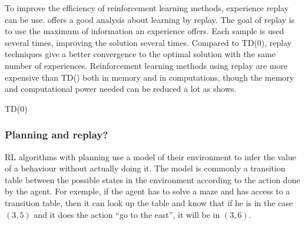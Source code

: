 \documentclass[]{article}
\begin{document}
To improve the efficiency of reinforcement learning methods, experience replay can be use. \textcite{vanseijen_deeper_2015} offers a good analysis about learning by replay. The goal of replay is to use the maximum of information an experience offers. Each sample is used several times, improving the solution several times. Compared to TD(0), replay techniques give a better convergence to the optimal solution with the same number of experiences. Reinforcement learning methods using replay are more expensive than TD(\textlambda) both in memory and in computations, though the memory and computational power needed can be reduced a lot as \textcite{vanseijen_deeper_2015} shows.

\begin{algorithm}[H]
  \DontPrintSemicolon
  \SetAlgoNoLine
  \caption{TD(0)}

\end{algorithm}

\subsubsection{Planning and replay?}
\label{subs:Planning and replay}

RL algorithms with planning use a model of their environment to infer the value  of a behaviour without actually doing it. The model is commonly a transition table between the possible states in the environment according to the action done by the agent. For exemple, if the agent has to solve a maze and has access to a transition table, then it can look up the table and know that if he is in the case \((3, 5)\) and it does the action ``go to the east'', it will be in \((3, 6)\).
\end{document}
